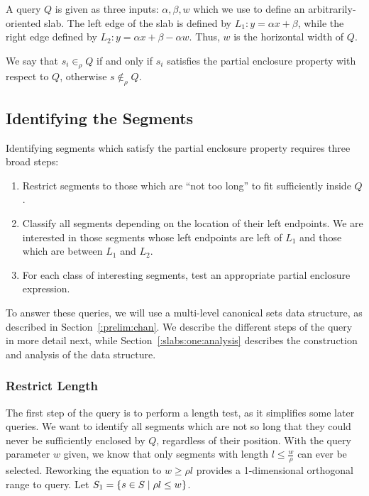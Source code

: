 A query $Q$ is given as three inputs: $\alpha, \beta, w$ which we use to define an arbitrarily-oriented slab.
The left edge of the slab is defined by $L_1 : y = \alpha x + \beta$, while the right edge defined by $L_2: y = \alpha x + \beta - \alpha w$. 
Thus, $w$ is the horizontal width of $Q$.

We say that $s_i \in_\rho Q$ if and only if $s_i$ satisfies the partial enclosure property with respect to $Q$, otherwise $s \not \in_\rho Q$.


\subsection{Identifying the Segments}
\label{:slabs:one:approach}

Identifying segments which satisfy the partial enclosure property requires three broad steps:

\begin{enumerate}
 \item Restrict segments to those which are ``not too long'' to fit sufficiently inside $Q$.

 \item Classify all segments depending on the location of their left endpoints. We are interested in those segments whose left endpoints are left of $L_1$ and those which are between $L_1$ and $L_2$.

 \item For each class of interesting segments, test an appropriate partial enclosure expression.

\end{enumerate}

To answer these queries, we will use a multi-level canonical sets data structure, as described in Section~\ref{:prelim:chan}. 
We describe the different steps of the query in more detail next, while Section~\ref{:slabs:one:analysis} describes the construction and analysis of the data structure.


\subsubsection{Restrict Length}
\label{:slabs:one:details:restrict}

The first step of the query is to perform a length test, as it simplifies some later queries.
We want to identify all segments which are not so long that they could never be sufficiently enclosed by $Q$, regardless of their position.
With the query parameter $w$ given, we know that only segments with length $l \leq \frac{w}{\rho}$ can ever be selected.
Reworking the equation to $w \geq \rho l$ provides a 1-dimensional orthogonal range to query.
Let $S_1 = \{ s \in S \;|\; \rho l \leq w \}$.


